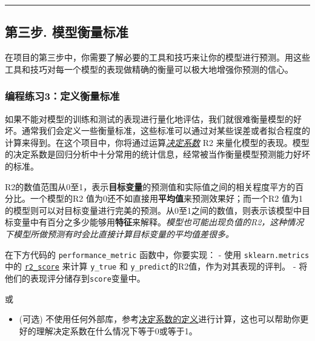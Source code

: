 \documentclass[11pt]{article}
\providecommand{\tightlist}{%
      \setlength{\itemsep}{0pt}\setlength{\parskip}{0pt}}
\begin{document}
    \begin{center}\rule{0.5\linewidth}{\linethickness}\end{center}

\subsection{第三步.
模型衡量标准}\label{ux7b2cux4e09ux6b65.-ux6a21ux578bux8861ux91cfux6807ux51c6}

在项目的第三步中，你需要了解必要的工具和技巧来让你的模型进行预测。用这些工具和技巧对每一个模型的表现做精确的衡量可以极大地增强你预测的信心。

    \subsubsection{编程练习3：定义衡量标准}\label{ux7f16ux7a0bux7ec3ux4e603ux5b9aux4e49ux8861ux91cfux6807ux51c6}

如果不能对模型的训练和测试的表现进行量化地评估，我们就很难衡量模型的好坏。通常我们会定义一些衡量标准，这些标准可以通过对某些误差或者拟合程度的计算来得到。在这个项目中，你将通过运算\href{http://stattrek.com/statistics/dictionary.aspx?definition=coefficient_of_determination}{\emph{决定系数}}
R2
来量化模型的表现。模型的决定系数是回归分析中十分常用的统计信息，经常被当作衡量模型预测能力好坏的标准。

R2的数值范围从0至1，表示\textbf{目标变量}的预测值和实际值之间的相关程度平方的百分比。一个模型的R2
值为0还不如直接用\textbf{平均值}来预测效果好；而一个R2
值为1的模型则可以对目标变量进行完美的预测。从0至1之间的数值，则表示该模型中目标变量中有百分之多少能够用\textbf{特征}来解释。\emph{模型也可能出现负值的R2，这种情况下模型所做预测有时会比直接计算目标变量的平均值差很多。}

在下方代码的 \texttt{performance\_metric} 函数中，你要实现： - 使用
\texttt{sklearn.metrics} 中的
\href{http://scikit-learn.org/stable/modules/generated/sklearn.metrics.r2_score.html}{\texttt{r2\_score}}
来计算 \texttt{y\_true} 和
\texttt{y\_predict}的R2值，作为对其表现的评判。 -
将他们的表现评分储存到\texttt{score}变量中。

或

\begin{itemize}
\tightlist
\item
  (可选)
  不使用任何外部库，参考\href{https://en.wikipedia.org/wiki/Coefficient_of_determination}{决定系数的定义}进行计算，这也可以帮助你更好的理解决定系数在什么情况下等于0或等于1。
\end{itemize}
\end{document}
